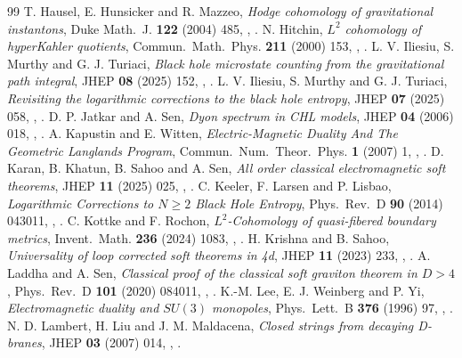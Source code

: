 \begin{thebibliography}{99}
 T. Hausel, E. Hunsicker and R. Mazzeo, \emph{Hodge cohomology of gravitational instantons}, Duke Math.\ J. \textbf{122} (2004) 485, , .
 N. Hitchin, \emph{$L^2$ cohomology of hyperKahler quotients}, Commun.\ Math.\ Phys. \textbf{211} (2000) 153, , .
 L. V. Iliesiu, S. Murthy and G. J. Turiaci, \emph{Black hole microstate counting from the gravitational path integral}, JHEP \textbf{08} (2025) 152, , .
 L. V. Iliesiu, S. Murthy and G. J. Turiaci, \emph{Revisiting the logarithmic corrections to the black hole entropy}, JHEP \textbf{07} (2025) 058, , .
 D. P. Jatkar and A. Sen, \emph{Dyon spectrum in CHL models}, JHEP \textbf{04} (2006) 018, , .
 A. Kapustin and E. Witten, \emph{Electric-Magnetic Duality And The Geometric Langlands Program}, Commun.\ Num.\ Theor.\ Phys. \textbf{1} (2007) 1, , .
 D. Karan, B. Khatun, B. Sahoo and A. Sen, \emph{All order classical electromagnetic soft theorems}, JHEP \textbf{11} (2025) 025, , .
 C. Keeler, F. Larsen and P. Lisbao, \emph{Logarithmic Corrections to $N\ge 2$ Black Hole Entropy}, Phys.\ Rev.\ D \textbf{90} (2014) 043011, , .
 C. Kottke and F. Rochon, \emph{$L^2$-Cohomology of quasi-fibered boundary metrics}, Invent.\ Math. \textbf{236} (2024) 1083, , .
 H. Krishna and B. Sahoo, \emph{Universality of loop corrected soft theorems in 4d}, JHEP \textbf{11} (2023) 233, , .
 A. Laddha and A. Sen, \emph{Classical proof of the classical soft graviton theorem in $D>4$}, Phys.\ Rev.\ D \textbf{101} (2020) 084011, , .
 K.-M. Lee, E. J. Weinberg and P. Yi, \emph{Electromagnetic duality and $SU(3)$ monopoles}, Phys.\ Lett.\ B \textbf{376} (1996) 97, , .
 N. D. Lambert, H. Liu and J. M. Maldacena, \emph{Closed strings from decaying D-branes}, JHEP \textbf{03} (2007) 014, , .

\end{thebibliography}
